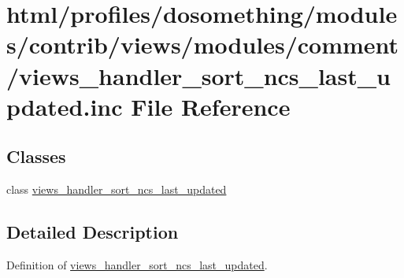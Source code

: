 \hypertarget{views__handler__sort__ncs__last__updated_8inc}{
\section{html/profiles/dosomething/modules/contrib/views/modules/comment/views\_\-handler\_\-sort\_\-ncs\_\-last\_\-updated.inc File Reference}
\label{views__handler__sort__ncs__last__updated_8inc}
}
\subsection*{Classes}
\begin{DoxyCompactItemize}
\item 
class \hyperlink{classviews__handler__sort__ncs__last__updated}{views\_\-handler\_\-sort\_\-ncs\_\-last\_\-updated}
\end{DoxyCompactItemize}


\subsection{Detailed Description}
Definition of \hyperlink{classviews__handler__sort__ncs__last__updated}{views\_\-handler\_\-sort\_\-ncs\_\-last\_\-updated}. 